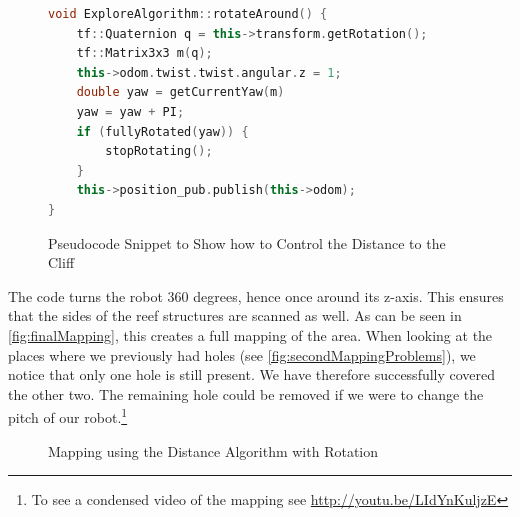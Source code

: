 \documentclass[twoside, 12pt]{article}
\begin{document}
\begin{figure}
\vspace{-2pt}
\begin{lstlisting}[language=C++]
void ExploreAlgorithm::rotateAround() {
    tf::Quaternion q = this->transform.getRotation();
    tf::Matrix3x3 m(q);
    this->odom.twist.twist.angular.z = 1;
    double yaw = getCurrentYaw(m) 
    yaw = yaw + PI;
    if (fullyRotated(yaw)) {
		stopRotating();
    }
    this->position_pub.publish(this->odom);
}
\end{lstlisting} 
\vspace{-38pt}
  \caption{Pseudocode Snippet to Show how to Control the Distance to the Cliff}
  \label{fig:codeRotation}
  \vspace{22pt}
\end{figure}

\begin{figure}
\vspace{-100pt}
\end{figure}

The code turns the robot 360 degrees, hence once around its z-axis. This ensures that the sides of the reef structures are scanned as well. As can be seen in \autoref{fig:finalMapping}, this creates a full mapping of the area. When looking at the places where we previously had holes (see \autoref{fig:secondMappingProblems}), we notice that only one hole is still present. We have therefore successfully covered the other two. The remaining hole could be removed if we were to change the pitch of our robot.\footnote{To see a condensed video of the mapping see \href{http://youtu.be/LIdYnKuljzE}{http://youtu.be/LIdYnKuljzE}}\\

\begin{figure}
\vspace{-20pt}
  \begin{center}
  \end{center}
\vspace{-20pt}
  \caption{Mapping using the Distance Algorithm with Rotation}
  \label{fig:finalMapping}
\vspace{12pt}
\end{figure}
\end{document}
